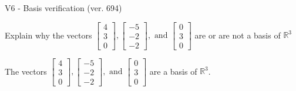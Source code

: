 \begin{exercise}
  \begin{exerciseTitle}V6 - Basis verification (ver. 694)\end{exerciseTitle}
  \begin{exerciseStatement}
    Explain why the vectors \(\left[\begin{array}{r}
4 \\
3 \\
0
\end{array}\right] , \left[\begin{array}{r}
-5 \\
-2 \\
-2
\end{array}\right] , \text{ and } \left[\begin{array}{r}
0 \\
3 \\
0
\end{array}\right]\) are or are not a basis of \(\mathbb{R}^3\)	


  \end{exerciseStatement}
  \begin{exerciseAnswer}
   The vectors \(\left[\begin{array}{r}
4 \\
3 \\
0
\end{array}\right] , \left[\begin{array}{r}
-5 \\
-2 \\
-2
\end{array}\right] , \text{ and } \left[\begin{array}{r}
0 \\
3 \\
0
\end{array}\right]\) 
  	 are  a basis of \(\mathbb{R}^3\).
  


  \end{exerciseAnswer}
\end{exercise}